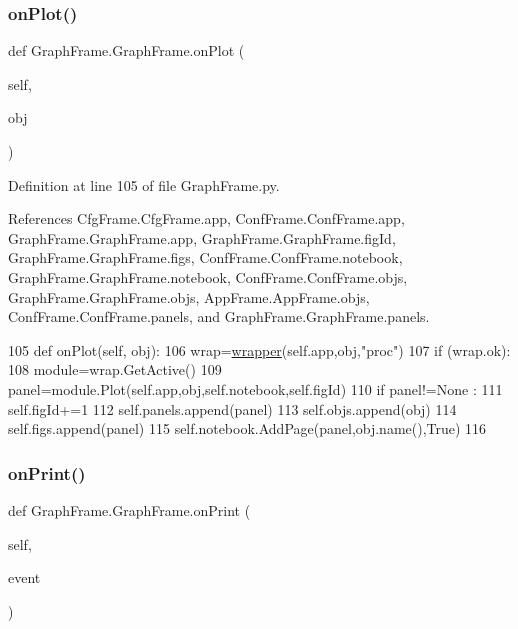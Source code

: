 \subsubsection{\texorpdfstring{on\+Plot()}{onPlot()}}
{\footnotesize\ttfamily def Graph\+Frame.\+Graph\+Frame.\+on\+Plot (\begin{DoxyParamCaption}\item[{}]{self,  }\item[{}]{obj }\end{DoxyParamCaption})}



Definition at line 105 of file Graph\+Frame.\+py.



References Cfg\+Frame.\+Cfg\+Frame.\+app, Conf\+Frame.\+Conf\+Frame.\+app, Graph\+Frame.\+Graph\+Frame.\+app, Graph\+Frame.\+Graph\+Frame.\+fig\+Id, Graph\+Frame.\+Graph\+Frame.\+figs, Conf\+Frame.\+Conf\+Frame.\+notebook, Graph\+Frame.\+Graph\+Frame.\+notebook, Conf\+Frame.\+Conf\+Frame.\+objs, Graph\+Frame.\+Graph\+Frame.\+objs, App\+Frame.\+App\+Frame.\+objs, Conf\+Frame.\+Conf\+Frame.\+panels, and Graph\+Frame.\+Graph\+Frame.\+panels.


\begin{DoxyCode}
105     \textcolor{keyword}{def }onPlot(self, obj):
106         wrap=\hyperlink{namespacewrapper}{wrapper}(self.app,obj,\textcolor{stringliteral}{"proc"})
107         \textcolor{keywordflow}{if} (wrap.ok):
108             module=wrap.GetActive()
109             panel=module.Plot(self.app,obj,self.notebook,self.figId)
110             \textcolor{keywordflow}{if} panel!=\textcolor{keywordtype}{None} :
111                 self.figId+=1
112                 self.panels.append(panel)
113                 self.objs.append(obj)
114                 self.figs.append(panel)
115                 self.notebook.AddPage(panel,obj.name(),\textcolor{keyword}{True})
116                 
\end{DoxyCode}
\mbox{\label{classGraphFrame_1_1GraphFrame_a3a50f27df2c9a224ca79506117392a6f}} 
\subsubsection{\texorpdfstring{on\+Print()}{onPrint()}}
{\footnotesize\ttfamily def Graph\+Frame.\+Graph\+Frame.\+on\+Print (\begin{DoxyParamCaption}\item[{}]{self,  }\item[{}]{event }\end{DoxyParamCaption})}



